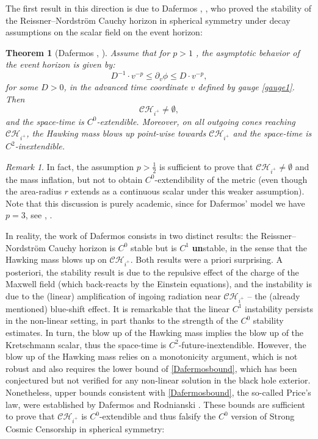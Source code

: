 \documentclass[10pt,a4paper]{article}
\theoremstyle{plain}
\newtheorem*{thmunb}{Theorem}
\theoremstyle{remark}
\newtheorem{rmk}{Remark}[section]
\theoremstyle{definition}
\theoremstyle{plain}
\theoremstyle{remark}
\theoremstyle{definition}
\newcommand{\CH}{\mathcal{CH}_{i^+}}
\numberwithin{equation}{section}
\begin{document}
The first result in this direction is due to Dafermos \cite{MihalisPHD}, \cite{Mihalis1}, who proved the stability of the Reissner--Nordstr\"{o}m Cauchy horizon in spherical symmetry under decay assumptions on the scalar field on the event horizon:
\begin{thmunb}[Dafermos \cite{MihalisPHD}, \cite{Mihalis1}]
	Assume that for $p>1$ \color{black}, the asymptotic behavior of the event horizon is given by: \begin{equation} \label{Dafermosbound}
	D^{-1} \cdot v^{-p} \leq 	\partial_v \phi \leq  D \cdot v^{-p},
	\end{equation} for some $D>0$, in the advanced time coordinate $v$ defined by gauge \eqref{gauge1}. Then $$\CH \neq \emptyset,$$ and the space-time is $C^0$-extendible\color{black}. Moreover, on all outgoing cones reaching $\CH$, the Hawking mass blows up point-wise towards $\CH$ and the space-time is $C^2$-inextendible\color{black}.
\end{thmunb} \begin{rmk}
In fact, the assumption $p>\frac{1}{2}$ is sufficient to prove that $\CH \neq \emptyset$ and the mass inflation, but not to obtain $C^0$-extendibility of the metric (even though the area-radius $r$ extends as a continuous scalar under this weaker assumption). Note that this discussion is purely academic, since for Dafermos' model we have $p=3$, see \cite{Newrp}, \cite{PriceLaw}. \color{black}
\end{rmk}In reality, the work of Dafermos consists in two distinct results: the Reissner--Nordstr\"{o}m Cauchy horizon is $C^0$ stable but is $C^1$ \textbf{un}stable, in the sense that the Hawking mass blows up on $\CH$. Both results were a priori surprising. A posteriori, the stability result is due to the repulsive effect of the charge of the Maxwell field (which back-reacts by the Einstein equations), and the instability is due to the (linear) amplification of ingoing radiation near $\CH$ -- the (already mentioned) blue-shift effect. It is remarkable that the linear $C^1$ instability persists in the non-linear setting, in part thanks to the strength of the $C^0$ stability estimates. In turn, the blow up of the Hawking mass implies the blow up of the Kretschmann scalar, thus the space-time is $C^2$-future-inextendible. However, the blow up of the Hawking mass relies on a monotonicity argument, which is not robust and also requires the lower bound of \eqref{Dafermosbound}, which has been conjectured but not verified for any non-linear solution in the black hole exterior. Nonetheless, upper bounds consistent with \eqref{Dafermosbound}, the so-called Price's law, were established by Dafermos and Rodnianski \cite{PriceLaw}. These bounds are sufficient to prove that $\CH$ is $C^0$-extendible and thus falsify the $C^0$ version of Strong Cosmic Censorship in spherical symmetry:
\end{document}
